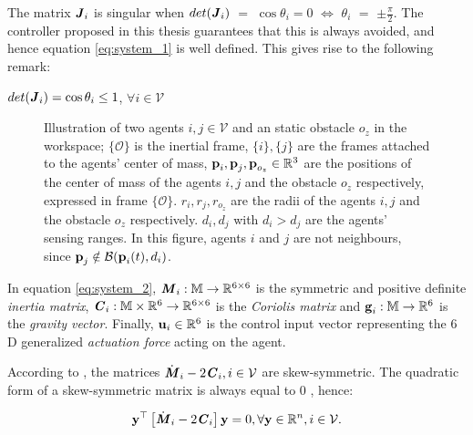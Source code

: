 The matrix $\bm{\mathit{J}}_i$ is singular when $det(\bm{\mathit{J}}_i)$ $=$ $\cos\theta_i = 0$
$\Leftrightarrow$ $\theta_i$ $=$ $\pm \frac{\pi}{2}$. The controller
proposed in this thesis guarantees that this is always avoided, and hence
equation \eqref{eq:system_1} is well defined. This gives rise to the following
remark:

\begin{bw_box}
  \begin{remark}
    $det(\bm{\mathit{J}}_i) = \cos\theta_i \leq 1$, $\forall i \in \mathcal{V}$
  \end{remark}
\end{bw_box}

\begin{figure}[ht!]
	\centering
    
    \caption{Illustration of two agents $i, j \in \mathcal{V}$ and an static
      obstacle $o_z$ in the workspace; $\{\mathcal{O}\}$ is the inertial frame,
      $\{i\}, \{j\}$ are the frames attached to the agents' center of mass,
      $\bm{\mathbf{p}}_i, \bm{\mathbf{p}}_j, \bm{\mathbf{p}}_{o_z} \in \mathbb{R}^3$ are the
      positions of the center of mass of the agents $i,j$ and the
      obstacle $o_z$ respectively, expressed in frame
      $\{\mathcal{O}\}$. $r_i, r_j, r_{o_z}$ are the radii of the agents $i,j$
      and the obstacle $o_z$ respectively. $d_i, d_j$ with
      $d_i > d_j$ are the agents' sensing ranges.
      In this figure, agents $i$ and $j$ are not neighbours, since
      $\bm{\mathbf{p}}_j \notin \mathcal{B}(\bm{\mathbf{p}}_i(t), d_i)$.}
	\label{fig:two_agents_one_obstacle}
\end{figure}

In equation \eqref{eq:system_2}, $\bm{\mathit{M}}_i:\mathbb{M} \to \mathbb{R}^{6\times6}$ is
the symmetric and positive definite \textit{inertia matrix},
$\bm{\mathit{C}}_i:\mathbb{M}\times\mathbb{R}^6 \to \mathbb{R}^{6\times6}$ is the
\textit{Coriolis matrix} and $\bm{\mathbf{g}}_i:\mathbb{M} \to \mathbb{R}^6$ is the
\textit{gravity vector}.
Finally, $\bm{\mathbf{u}}_i\in\mathbb{R}^6$ is the control input vector representing
the $6$D generalized \textit{actuation force} acting on the agent.



\begin{bw_box}
  \begin{remark}
    According to \cite{Siciliano2009}, the matrices
    $\dot{\bm{\mathit{M}}}_i - 2\bm{\mathit{C}}_i, i \in \mathcal{V}$ are skew-symmetric.
    The quadratic form of a skew-symmetric matrix is always equal to 0
    \cite{horn_jonshon}, hence:

    \begin{equation}
      \bm{\mathbf{y}}^\top \left[\dot{\bm{\mathit{M}}}_i - 2 \bm{\mathit{C}}_i\right]\bm{\mathbf{y}} = 0,
        \forall \bm{\mathbf{y}} \in \mathbb{R}^n, i \in \mathcal{V}.
    \label{eq:skew_symm}
    \end{equation}
  \end{remark}
\end{bw_box}

